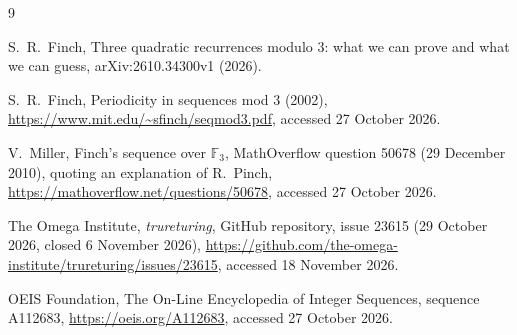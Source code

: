 \documentclass[11pt]{amsart}
\theoremstyle{definition}
\begin{document}
\begin{thebibliography}{9}

 S.~R.~Finch, Three quadratic recurrences modulo $3$: what we can prove and what we can guess,
arXiv:2610.34300v1 (2026).

 S.~R.~Finch, Periodicity in sequences mod $3$ (2002),
\url{https://www.mit.edu/~sfinch/seqmod3.pdf}, accessed 27 October 2026.

 V.~Miller, Finch's sequence over $\mathbb{F}_3$, MathOverflow question 50678 (29 December 2010),
quoting an explanation of R.~Pinch, \url{https://mathoverflow.net/questions/50678}, accessed 27 October 2026.

 The Omega Institute, \emph{trureturing}, GitHub repository, issue 23615 (29 October 2026, closed
6 November 2026), \url{https://github.com/the-omega-institute/trureturing/issues/23615}, accessed 18 November 2026.

 OEIS Foundation, The On-Line Encyclopedia of Integer Sequences, sequence A112683,
\url{https://oeis.org/A112683}, accessed 27 October 2026.

\end{thebibliography}
\end{document}
